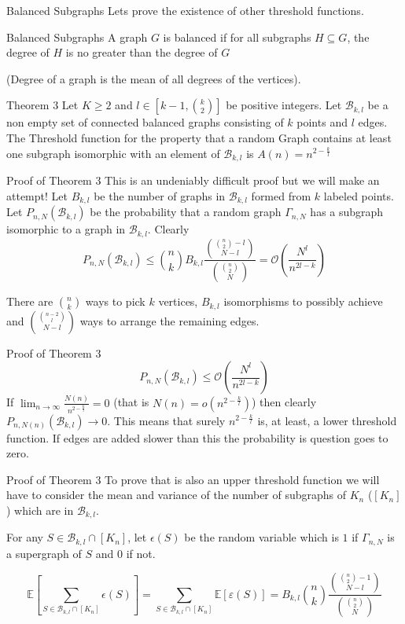 \documentclass{beamer}
\begin{document}
\begin{frame}{Balanced Subgraphs}
	Lets prove the existence of other threshold functions. 
	\begin{block}{Balanced Subgraphs}
		A graph $G$ is balanced if for all subgraphs $H\subseteq G$, the degree of $H$ is no greater than the degree of $G$ 
		
		(Degree of a graph is the mean of all degrees of the vertices). 
	\end{block} 
	\begin{block}{Theorem 3}
		Let $K\geq 2$ and $l \in [k-1,{k\choose 2}]$ be positive integers. Let $\mathcal{B}_{k,l}$ be a non empty set of connected balanced graphs consisting of $k$ points and $l$ edges. The Threshold function for the property that a random Graph contains at least one subgraph isomorphic with an element of $\mathcal{B}_{k,l}$ is $A(n)=n^{2-\frac{k}{l}}$
	\end{block} 
\end{frame}
\begin{frame}{Proof of Theorem 3}
	This is an undeniably difficult proof but we will make an attempt! Let $B_{k,l}$ be the number of graphs in $\mathcal{B}_{k,l}$ formed from $k$ labeled points. Let $P_{n,N}(\mathcal{B}_{k,l})$ be the probability that a random graph $\Gamma_{n,N}$ has a subgraph isomorphic to a graph in $\mathcal{B}_{k,l}$. Clearly
	$$P_{n,N}(\mathcal{B}_{k,l})\leq {n\choose k}B_{k,l}\frac{{{n\choose 2}-l\choose N-l}}{{{n\choose 2}\choose N}} = \mathcal{O}\left(\frac{N^l}{n^{2l-k}}\right)$$
	
	There are ${n\choose k}$ ways to pick $k$ vertices, $B_{k,l}$ isomorphisms to possibly achieve and ${{n-2\choose l}\choose N-l}$ ways to arrange the remaining edges.
\end{frame}

\begin{frame}{Proof of Theorem 3}
	$$P_{n,N}(\mathcal{B}_{k,l})\leq \mathcal{O}\left(\frac{N^l}{n^{2l-k}}\right)$$
	If $\lim_{n\rightarrow \infty}\frac{N(n)}{n^{2-\frac{k}{l}}}=0$ (that is $N(n)=o(n^{2-\frac{k}{l}})$) then clearly $P_{n,N(n)}(\mathcal{B}_{k,l})\rightarrow 0$. This means that surely $n^{2-\frac{k}{l}}$ is, at least, a lower threshold function. If edges are added slower than this the probability is question goes to zero.  
\end{frame}
\begin{frame}{Proof of Theorem 3}
	To prove that is also an upper threshold function we will have to consider the mean and variance of the number of subgraphs of $K_n$ ($[K_n]$)  which are in $\mathcal{B}_{k,l}$. 
	
	For any $S\in \mathcal{B}_{k,l}\cap [K_n]$, let $\epsilon(S)$ be the random variable which is $1$ if $\Gamma_{n,N}$ is a supergraph of $S$ and 0 if not.
	
	$$\mathbb{E}\left[\sum_{S\in \mathcal{B}_{k,l}\cap [K_n]} \epsilon(S)\right]=\sum_{S\in \mathcal{B}_{k,l}\cap [K_n]}\mathbb{E}\left[\varepsilon(S)\right]=B_{k,l}{n\choose k}\frac{{{n\choose 2}-1\choose N-l}}{{{n\choose 2}\choose N}}$$ 
\end{frame}
\end{document}
